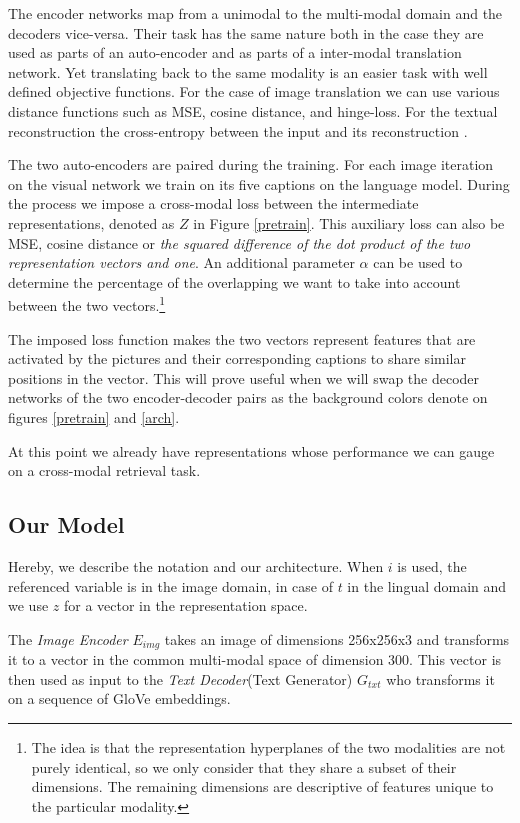 \documentclass[twocolumn]{article}
\begin{document}
The encoder networks map from a unimodal to the multi-modal domain and the decoders vice-versa. Their task has the same nature both in the case they are used as parts of an auto-encoder and as parts of a inter-modal translation network. Yet translating back to the same modality is an easier task with well defined objective functions. For the case of image translation we can use various distance functions such as MSE, cosine distance, and hinge-loss\cite{DBLP:journals/corr/KimCKLK17}. For the textual reconstruction the cross-entropy between the input and its reconstruction \cite{oshri2016there}.

The two auto-encoders are paired during the training. For each image iteration on the visual network we train on its five captions on the language model. During the process we impose a cross-modal loss between the intermediate representations, denoted as $Z$ in Figure \ref{pretrain}. This auxiliary loss can also be MSE, cosine distance or \textit{the squared difference of the dot product of the two representation vectors and one}. An additional parameter $\alpha$ can be used to determine the percentage of the overlapping we want to take into account between the two vectors.\footnote{The idea is that the representation hyperplanes of the two modalities are not purely identical, so we only consider that they share a subset of their dimensions. The remaining dimensions are descriptive of features unique to the particular modality.}

The imposed loss function makes the two vectors represent features that are activated by the pictures and their corresponding captions to share similar positions in the vector. This will prove useful when we will swap the decoder networks of the two encoder-decoder pairs as the background colors denote on figures \ref{pretrain} and \ref{arch}.  

At this point we already have representations whose performance we can gauge on a cross-modal retrieval task.

\subsection{Our Model}

Hereby, we describe the notation and our architecture. When \boldmath$i$ is used, the referenced variable is in the image domain, in case of \boldmath$t$ in the lingual domain and we use \boldmath$z$ for a vector in the representation space. 

The \textit{Image Encoder} \boldmath$E_{img}$ takes an image of dimensions 256x256x3 and transforms it to a vector in the common multi-modal space of dimension 300. This vector is then used as input to the \textit{Text Decoder}(Text Generator) \boldmath$G_{txt}$ who transforms it on a sequence of GloVe embeddings.
\end{document}
